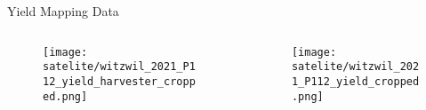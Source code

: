 \begin{frame}{Yield Mapping Data}
	\begin{columns}
		
		\begin{column}{0.48\textwidth}
			\begin{figure}
				\texttt{[image: satelite/witzwil\_2021\_P112\_yield\_harvester\_cropped.png]}
			\end{figure}
		\end{column}
		\begin{column}{0.48\textwidth}
			\begin{figure}
				\texttt{[image: satelite/witzwil\_2021\_P112\_yield\_cropped.png]}
			\end{figure}
		\end{column}
		
	\end{columns}

\end{frame}
